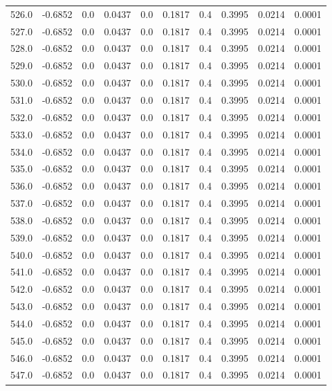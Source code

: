 \begin{longtable}{lrrrrrrrrr}
526.0 & -0.6852 & 0.0 & 0.0437 & 0.0 & 0.1817 & 0.4 & 0.3995 & 0.0214 & 0.0001 \\
527.0 & -0.6852 & 0.0 & 0.0437 & 0.0 & 0.1817 & 0.4 & 0.3995 & 0.0214 & 0.0001 \\
528.0 & -0.6852 & 0.0 & 0.0437 & 0.0 & 0.1817 & 0.4 & 0.3995 & 0.0214 & 0.0001 \\
529.0 & -0.6852 & 0.0 & 0.0437 & 0.0 & 0.1817 & 0.4 & 0.3995 & 0.0214 & 0.0001 \\
530.0 & -0.6852 & 0.0 & 0.0437 & 0.0 & 0.1817 & 0.4 & 0.3995 & 0.0214 & 0.0001 \\
531.0 & -0.6852 & 0.0 & 0.0437 & 0.0 & 0.1817 & 0.4 & 0.3995 & 0.0214 & 0.0001 \\
532.0 & -0.6852 & 0.0 & 0.0437 & 0.0 & 0.1817 & 0.4 & 0.3995 & 0.0214 & 0.0001 \\
533.0 & -0.6852 & 0.0 & 0.0437 & 0.0 & 0.1817 & 0.4 & 0.3995 & 0.0214 & 0.0001 \\
534.0 & -0.6852 & 0.0 & 0.0437 & 0.0 & 0.1817 & 0.4 & 0.3995 & 0.0214 & 0.0001 \\
535.0 & -0.6852 & 0.0 & 0.0437 & 0.0 & 0.1817 & 0.4 & 0.3995 & 0.0214 & 0.0001 \\
536.0 & -0.6852 & 0.0 & 0.0437 & 0.0 & 0.1817 & 0.4 & 0.3995 & 0.0214 & 0.0001 \\
537.0 & -0.6852 & 0.0 & 0.0437 & 0.0 & 0.1817 & 0.4 & 0.3995 & 0.0214 & 0.0001 \\
538.0 & -0.6852 & 0.0 & 0.0437 & 0.0 & 0.1817 & 0.4 & 0.3995 & 0.0214 & 0.0001 \\
539.0 & -0.6852 & 0.0 & 0.0437 & 0.0 & 0.1817 & 0.4 & 0.3995 & 0.0214 & 0.0001 \\
540.0 & -0.6852 & 0.0 & 0.0437 & 0.0 & 0.1817 & 0.4 & 0.3995 & 0.0214 & 0.0001 \\
541.0 & -0.6852 & 0.0 & 0.0437 & 0.0 & 0.1817 & 0.4 & 0.3995 & 0.0214 & 0.0001 \\
542.0 & -0.6852 & 0.0 & 0.0437 & 0.0 & 0.1817 & 0.4 & 0.3995 & 0.0214 & 0.0001 \\
543.0 & -0.6852 & 0.0 & 0.0437 & 0.0 & 0.1817 & 0.4 & 0.3995 & 0.0214 & 0.0001 \\
544.0 & -0.6852 & 0.0 & 0.0437 & 0.0 & 0.1817 & 0.4 & 0.3995 & 0.0214 & 0.0001 \\
545.0 & -0.6852 & 0.0 & 0.0437 & 0.0 & 0.1817 & 0.4 & 0.3995 & 0.0214 & 0.0001 \\
546.0 & -0.6852 & 0.0 & 0.0437 & 0.0 & 0.1817 & 0.4 & 0.3995 & 0.0214 & 0.0001 \\
547.0 & -0.6852 & 0.0 & 0.0437 & 0.0 & 0.1817 & 0.4 & 0.3995 & 0.0214 & 0.0001 \\

\end{longtable}
